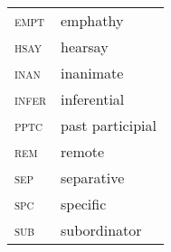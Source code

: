 \documentclass[output=paper]{langsci/langscibook}
\begin{document}
\begin{tabularx}{.45\textwidth}{lQ}
\textsc{	empt	}	&	emphathy	\\
\textsc{	hsay	}	&	hearsay	\\
\textsc{	inan	}	&	inanimate	\\
\textsc{	infer	}	&	inferential	\\
\textsc{	pptc	}	&	past participial	\\
\textsc{	rem	}	&	remote	\\
\textsc{	sep	}	&	separative	\\
\textsc{	spc	}	&	specific	\\
\textsc{	sub	}	&	subordinator	\\
\end{tabularx}



\sloppy
\printbibliography[heading=subbibliography,notkeyword=this] 
\end{document}
